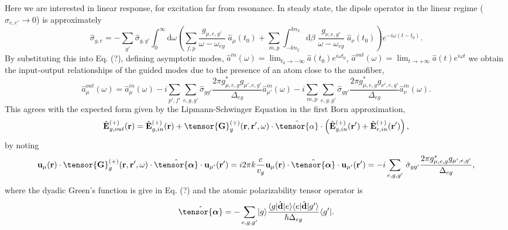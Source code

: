 \documentclass[preprint,aps,pra,onecolumn]{revtex4-1} %
\begin{document}
Here we are interested in linear response, for excitation far from resonance.  In steady state, the dipole operator in the linear regime ($\hat{\sigma}_{e,e'} \rightarrow 0 $) is approximately
\begin{equation}
\hat{\sigma}_{g,e} =  -\sum_{g'} \hat{\sigma}_{g,g'}\int_0^{\infty}\mathrm{d}\omega \left(\sum_{f,p}  \frac{g_{\mu, e,g'}}{\omega-\omega_{eg}}\; \hat{a}_\mu (t_0)+\sum_{m,p}  \int_{-kn_2}^{kn_2}\mathrm{d}\beta \; \frac{g_{\nu, e,g'}}{\omega-\omega_{eg}} \;\hat{a}_\nu (t_0)  \right)e^{-i\omega (t-t_0)} .
\end{equation}
By substituting this into Eq. (?), defining asymptotic modes, $\hat{a}^{in}(\omega) = \lim_{t_0\rightarrow -\infty} \hat{a}(t_0) e^{i\omega t_0}$, $\hat{a}^{out}(\omega) = \lim_{t\rightarrow +\infty} \hat{a}(t) e^{i\omega t}$ we obtain the input-output relationships of the guided modes due to the presence of an atom close to the nanofiber,
\begin{equation}
\hat{a}^{out}_\mu (\omega) = \hat{a}^{in}_\mu (\omega) \!-\! i\sum_{p',f'} \sum_{e,g,g'}\!\hat{\sigma}_{gg'}\frac{2\pi g_{\mu,e,g}^* g_{\mu',e,g'}}{\Delta_{eg}}\hat{a}^{in}_{\mu'}(\omega) \!-\! i\sum_{m,p} \sum_{e,g,g'}\!\hat{\sigma}_{gg'}\frac{2\pi  g_{\mu,e,g}^* g_{\nu',e,g'}}{\Delta_{eg}}\hat{a}^{in}_{\nu}(\omega).
\end{equation}
This agrees with the expected form given by the Lipmann-Schwinger Equation in the first Born approximation,
\begin{equation}
\hat{\mathbf{E}}^{(+)}_{g,out}(\br)=\hat{\mathbf{E}}^{(+)}_{g, in}(\br)+\tensor{\mathbf{G}}_g^{(+)}(\br,\br',\omega)\cdot\hat{\tensor{\alpha}}\cdot \left(\hat{\mathbf{E}}^{(+)}_{g, in}(\br')+\hat{\mathbf{E}}^{(+)}_{r, in}(\br')\right),
\end{equation}
by noting
\begin{equation}
 \mathbf{u}_{\mu} (\br)\cdot \tensor{\mathbf{G}}_g^{(+)}(\br,\br',\omega)\cdot \hat{\tensor{\boldsymbol{\alpha}}}\cdot \mathbf{u}_{\mu'} (\br') = i 2\pi k\frac{c}{v_g} \mathbf{u}_\mu (\br) \cdot \hat{\tensor{\boldsymbol{\alpha}}}\cdot \mathbf{u}_{\mu'} (\br') = - i \sum_{e,g,g'}\!\ \hat{\sigma}_{gg'} \frac{2\pi g_{\mu,e,g}^* g_{\mu',e,g'}}{\Delta_{eg}},
\end{equation}
where the dyadic Green's function is give in Eq. (?) and the atomic polarizability tensor operator is
\begin{equation}
\hat{\tensor{\boldsymbol{\alpha}}} = -\sum_{e,g,g'}\ket{g}\frac{\bra{g}\hat{\mathbf{d}}\ket{e}\bra{e} \hat{\mathbf{d}}\ket{g'}}{\hbar \Delta_{eg}}\bra{g'}.
\end{equation}
\end{document}
